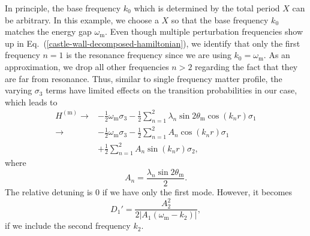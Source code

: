 \documentclass[%
reprint,
 amsmath,amssymb,
 prd,
]{revtex4-1}
\newcommand{\RD}{D}
\begin{document}
In principle, the base frequency $k_0$ which is determined by the total period $X$ can be arbitrary. In this example, we choose a $X$ so that the base frequency $k_0$ matches the energy gap $\omega_{\mathrm{m}}$. Even though multiple perturbation frequencies show up in Eq.~(\ref{castle-wall-decomposed-hamiltonian}), we identify that only the first frequency $n=1$ is the resonance frequency since we are using $k_0=\omega_{\mathrm{m}}$. As an approximation, we drop all other frequencies $n>2$ regarding the fact that they are far from resonance. Thus, similar to single frequency matter profile, the varying $\sigma_3$ terms have limited effects on the transition probabilities in our case, which leads to
\begin{align*}
    H^{(\mathrm m)} \to & - \frac{1}{2}\omega_{\mathrm m} \sigma_3  - \frac{1}{2} \sum_{n=1}^2\lambda_n \sin 2\theta_{\mathrm m}  \cos\left( k_n r \right) \sigma_1\\
    \to & - \frac{1}{2}\omega_{\mathrm m} \sigma_3  - \frac{1}{2} \sum_{n=1}^2 A_n \cos ( k_n r) \sigma_1 \\
    & + \frac{1}{2} \sum_{n=1}^2A_n \sin(k_n r) \sigma_2,
\end{align*}
where
\begin{equation*}
A_n = \frac{\lambda_n \sin 2\theta_{\mathrm m} }{2} .
\end{equation*}
The relative detuning is $0$ if we have only the first mode. However, it becomes
\begin{equation}
\RD_1'= \frac{A_2^2}{2\lvert A_1 (\omega_{\mathrm m} - k_2) \rvert},   
\end{equation}
if we include the second frequency $k_2$.
\end{document}

